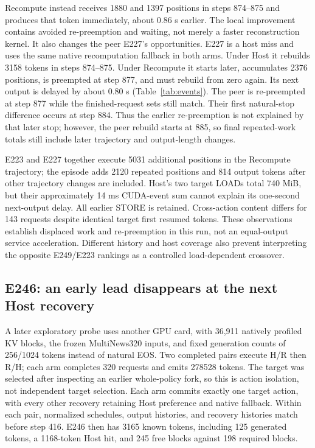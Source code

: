 \documentclass[10pt,a4paper]{article}
\begin{document}
Recompute instead receives 1880 and 1397 positions in steps 874--875 and
produces that token immediately, about 0.86 s earlier. The local improvement
contains avoided re-preemption and waiting, not merely a faster reconstruction
kernel. It also changes the peer E227's opportunities. E227 is a host miss and
uses the same native recomputation fallback in both arms. Under Host it rebuilds
3158 tokens in steps 874--875. Under Recompute it starts later, accumulates
2376 positions, is preempted at step 877, and must rebuild from zero again.
Its next output is delayed by about 0.80 s (Table~\ref{tab:events}).
The peer is re-preempted at step 877 while the finished-request sets still
match. Their first natural-stop difference occurs at step 884. Thus the earlier
re-preemption is not explained by that later stop; however, the peer rebuild
starts at 885, so final repeated-work totals still include later trajectory
and output-length changes.

E223 and E227 together execute 5031 additional positions in the Recompute
trajectory; the episode adds 2120 repeated positions and 814 output tokens after
other trajectory changes are included. Host's two target LOADs total 740 MiB,
but their approximately 14 ms CUDA-event sum cannot explain its one-second
next-output delay. All earlier STORE is retained. Cross-action content differs
for 143 requests despite identical target first resumed tokens. These
observations establish displaced work and re-preemption in this run, not an
equal-output service acceleration. Different history and host coverage also
prevent interpreting the opposite E249/E223 rankings as a controlled
load-dependent crossover.

\subsection{E246: an early lead disappears at the next Host recovery}
A later exploratory probe uses another GPU card, with 36,911 natively profiled
KV blocks, the frozen MultiNews320 inputs, and fixed generation counts of
256/1024 tokens instead of natural EOS. Two completed pairs execute H/R then
R/H; each arm completes 320 requests and emits 278528 tokens. The target was
selected after inspecting an earlier whole-policy fork, so this is action
isolation, not independent target selection. Each arm commits exactly one
target action, with every other recovery retaining Host preference and native
fallback. Within each pair, normalized schedules, output histories, and
recovery histories match before step 416. E246 then has 3165 known tokens,
including 125 generated tokens, a 1168-token Host hit, and 245 free blocks
against 198 required blocks.
\end{document}
